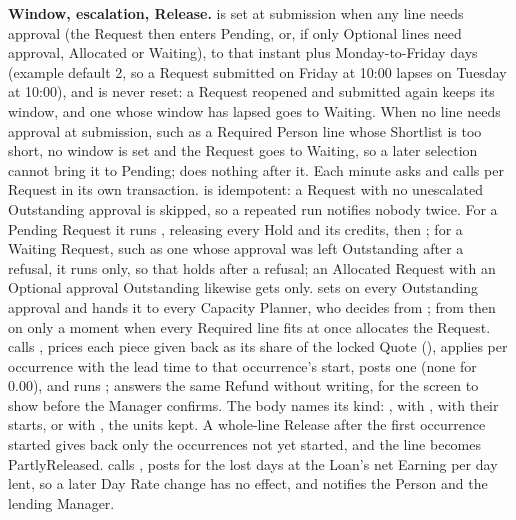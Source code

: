 \textbf{Window, escalation, Release.}  is set at submission when any line needs approval (the Request then enters Pending, or, if only Optional lines need approval, Allocated or Waiting), to that instant plus  Monday-to-Friday days (example default 2, so a Request submitted on Friday at 10:00 lapses on Tuesday at 10:00), and is never reset: a Request reopened and submitted again keeps its window, and one whose window has lapsed goes to Waiting. When no line needs approval at submission, such as a Required Person line whose Shortlist is too short, no window is set and the Request goes to Waiting, so a later selection cannot bring it to Pending;  does nothing after it. Each minute  asks  and calls  per Request in its own transaction.  is idempotent: a Request with no unescalated Outstanding approval is skipped, so a repeated run notifies nobody twice. For a Pending Request it runs , releasing every Hold and its credits, then ; for a Waiting Request, such as one whose approval was left Outstanding after a refusal, it runs  only, so that  holds after a refusal; an Allocated Request with an Optional approval Outstanding likewise gets  only.  sets  on every Outstanding approval and hands it to every Capacity Planner, who decides from ; from then on only a moment when every Required line fits at once allocates the Request.  calls , prices each piece given back as its share of the locked Quote (), applies  per occurrence with the lead time to that occurrence's start, posts one  (none for 0.00), and runs ;  answers the same Refund without writing, for the screen to show before the Manager confirms. The body names its kind: ,  with ,  with their starts, or  with , the units kept. A whole-line Release after the first occurrence started gives back only the occurrences not yet started, and the line becomes PartlyReleased.  calls , posts  for the lost days at the Loan's net Earning per day lent, so a later Day Rate change has no effect, and notifies the Person and the lending Manager.

